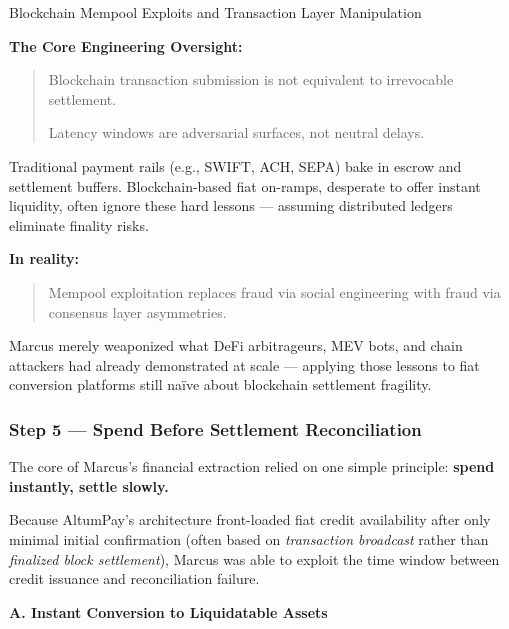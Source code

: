 \begin{HistoricalSidebar}{Blockchain Mempool Exploits and Transaction Layer Manipulation}
    \medskip
    
    \textbf{The Core Engineering Oversight:}
    
    \begin{quote}
    Blockchain transaction submission is not equivalent to irrevocable settlement.
    
    Latency windows are adversarial surfaces, not neutral delays.
    \end{quote}
    
    Traditional payment rails (e.g., SWIFT, ACH, SEPA) bake in escrow and settlement buffers. Blockchain-based fiat on-ramps, desperate to offer instant liquidity, often ignore these hard lessons --- assuming distributed ledgers eliminate finality risks.
    
    \medskip
    
    \textbf{In reality:}
    
    \begin{quote}
    Mempool exploitation replaces fraud via social engineering  
    with fraud via consensus layer asymmetries.
    \end{quote}
    
    Marcus merely weaponized what DeFi arbitrageurs, MEV bots, and chain attackers had already demonstrated at scale --- applying those lessons to fiat conversion platforms still naïve about blockchain settlement fragility.
    
\end{HistoricalSidebar}



\medskip

\subsubsection*{Step 5 --- Spend Before Settlement Reconciliation}

The core of Marcus’s financial extraction relied on one simple principle: \textbf{spend instantly, settle slowly.}

\medskip

Because AltumPay’s architecture front-loaded fiat credit availability after only minimal initial confirmation (often based on \textit{transaction broadcast} rather than \textit{finalized block settlement}), Marcus was able to exploit the time window between credit issuance and reconciliation failure.

\medskip

\textbf{A. Instant Conversion to Liquidatable Assets}

